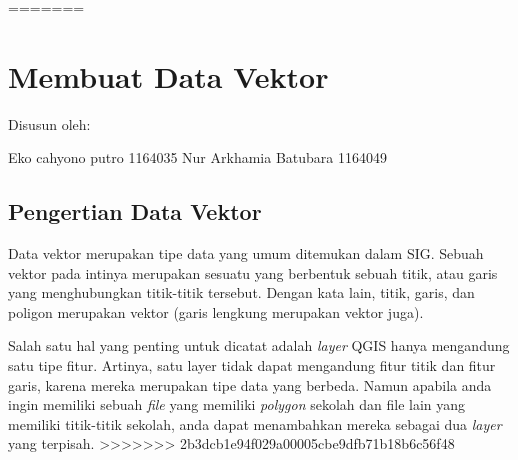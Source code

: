 =======
\section{Membuat Data Vektor}
Disusun oleh:

Eko cahyono putro 1164035
Nur Arkhamia Batubara 1164049

\subsection {Pengertian Data Vektor}
Data vektor merupakan tipe data yang umum ditemukan dalam SIG. Sebuah vektor pada intinya merupakan sesuatu yang berbentuk sebuah titik, atau garis yang menghubungkan titik-titik tersebut. Dengan kata lain, titik, garis, dan poligon merupakan vektor (garis lengkung merupakan vektor juga).

Salah satu hal yang penting untuk dicatat adalah \textit{layer} QGIS hanya mengandung satu tipe fitur. Artinya, satu layer tidak dapat mengandung fitur titik dan fitur garis, karena mereka merupakan tipe data yang berbeda. Namun apabila anda ingin memiliki sebuah \textit{file} yang memiliki \textit{polygon} sekolah dan file lain yang memiliki titik-titik sekolah, anda dapat menambahkan mereka sebagai dua \textit{layer} yang terpisah\cite{setiawan2018membuka}.
>>>>>>> 2b3dcb1e94f029a00005cbe9dfb71b18b6c56f48
